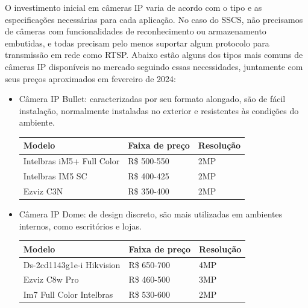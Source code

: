 \documentclass[12pt, %
openright, 
oneside, %
a4paper,    %
brazil]{facom-ufu-abntex2}
\begin{document}
O investimento inicial em câmeras IP varia de acordo com o tipo e as
especificações necessárias para cada aplicação. No caso do SSCS, não precisamos
de câmeras com funcionalidades de reconhecimento ou armazenamento embutidas, e
todas precisam pelo menos suportar algum protocolo para transmissão em rede
como RTSP. Abaixo estão alguns dos tipos mais comuns de câmeras IP disponíveis
no mercado seguindo essas necessidades, juntamente com seus preços aproximados
em fevereiro de 2024:

\begin{itemize}
	\item Câmera IP Bullet: caracterizadas por seu formato alongado, são de
	      fácil instalação, normalmente instaladas no exterior e resistentes às condições
	      do ambiente.
	      \begin{center}
		      \begin{tabular}{|l|l|l|}
			      \hline
			      Modelo                    & Faixa de preço &
			      Resolução
			      \\ \hline
			      Intelbras iM5+ Full Color & R\$ 500-550    & 2MP
			      \\ \hline
			      Intelbras IM5 SC          & R\$ 400-425    & 2MP
			      \\ \hline
			      Ezviz C3N                 & R\$ 350-400    & 2MP
			      \\ \hline
		      \end{tabular}
	      \end{center}

	\item Câmera IP Dome: de design discreto, são mais utilizadas em
	      ambientes internos, como escritórios e lojas.
	      \begin{center}
		      \begin{tabular}{|l|l|l|}
			      \hline
			      Modelo                    & Faixa de preço &
			      Resolução
			      \\ \hline
			      Ds-2cd1143g1e-i Hikvision & R\$ 650-700    & 4MP
			      \\ \hline
			      Ezviz C8w Pro             & R\$ 460-500    & 3MP
			      \\ \hline
			      Im7 Full Color Intelbras  & R\$ 530-600    & 2MP
			      \\ \hline
		      \end{tabular}
	      \end{center}
\end{itemize}
\end{document}
